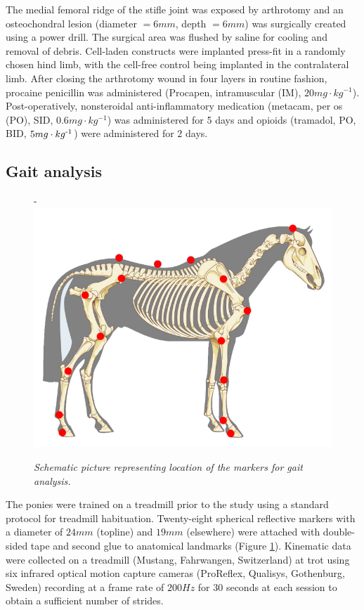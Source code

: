 \documentclass[twocolumn, empirical, authordate, issue]{jote-new-article}
\begin{document}
The medial femoral ridge of the stifle joint was exposed by arthrotomy and an osteochondral lesion (diameter $= 6 mm$, depth $= 6 mm$) was surgically created using a power drill. The surgical area was flushed by saline for cooling and removal of debris. Cell-laden constructs were implanted press-fit in a randomly chosen hind limb, with the cell-free control being implanted in the contralateral limb. After closing the arthrotomy wound in four layers in routine fashion, procaine penicillin was administered (Procapen, intramuscular (IM), $ 20 mg\cdot kg^{-1} $). Post-operatively, nonsteroidal anti-inflammatory medication (metacam, per os (PO), SID, $ 0.6 mg\cdot kg^{-1} $) was administered for 5 days and opioids (tramadol, PO, BID, $5 mg\cdot kg\textsuperscript{-1}$) were administered for $2$ days.

\subsection{Gait analysis} 
\begin{figure}[b!]
      \captionsetup{width=\dimexpr \linewidth + .8\fullwidthlen\relax}

\begin{adjustwidth}{-\fullwidthlen}{}
\includegraphics[width=\linewidth]{media/image3.png}
\caption{\emph{Schematic picture representing location of the markers for gait analysis.}}
\label{fig:figure3}
\end{adjustwidth} 
\end{figure}

The ponies were trained on a treadmill prior to the study using a standard protocol for treadmill habituation. Twenty-eight spherical reflective markers with a diameter of $24 mm$ (topline) and $19 mm$ (elsewhere) were attached with double-sided tape and second glue to anatomical landmarks (Figure \ref{fig:figure3}). Kinematic data were collected on a treadmill (Mustang, Fahrwangen, Switzerland) at trot using six infrared optical motion capture cameras (ProReflex, Qualisys, Gothenburg, Sweden) recording at a frame rate of $200 Hz$ for $30$ seconds at each session to obtain a sufficient number of strides.
\end{document}
